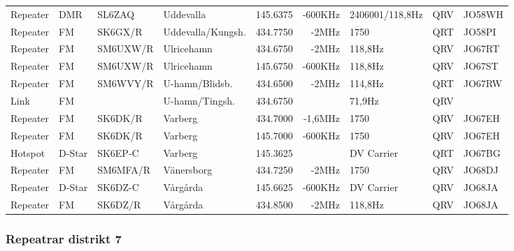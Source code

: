 \begin{longtable}{llllrrlcl}
Repeater & DMR    & SL6ZAQ   & Uddevalla           & 145.6375  & -600KHz & 2406001/118,8Hz & QRV  & JO58WH \\
Repeater & FM     & SK6GX/R  & Uddevalla/Kungsh.   & 434.7750  & -2MHz   & 1750            & QRT  & JO58PI \\
Repeater & FM     & SM6UXW/R & Ulricehamn          & 434.6750  & -2MHz   & 118,8Hz         & QRV  & JO67RT \\
Repeater & FM     & SM6UXW/R & Ulricehamn          & 145.6750  & -600KHz & 118,8Hz         & QRV  & JO67ST \\
Repeater & FM     & SM6WVY/R & U-hamn/Blidsb.      & 434.6500  & -2MHz   & 114,8Hz         & QRT  & JO67RW \\
Link     & FM     &          & U-hamn/Tingsh.      & 434.6750  &         & 71,9Hz          & QRV  &        \\
Repeater & FM     & SK6DK/R  & Varberg             & 434.7000  & -1,6MHz & 1750            & QRV  & JO67EH \\
Repeater & FM     & SK6DK/R  & Varberg             & 145.7000  & -600KHz & 1750            & QRV  & JO67EH \\
Hotspot  & D-Star & SK6EP-C  & Varberg             & 145.3625  &         & DV Carrier      & QRT  & JO67BG \\
Repeater & FM     & SM6MFA/R & Vänersborg          & 434.7250  & -2MHz   & 1750            & QRV  & JO68DJ \\
Repeater & D-Star & SK6DZ-C  & Vårgårda            & 145.6625  & -600KHz & DV Carrier      & QRV  & JO68JA \\
Repeater & FM     & SK6DZ/R  & Vårgårda            & 434.8500  & -2MHz   & 118,8Hz         & QRV  & JO68JA

\end{longtable}

\subsubsection{Repeatrar distrikt 7}

